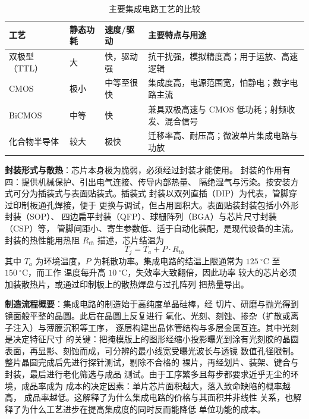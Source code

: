 \begin{table}[htbp]
\centering
\caption{主要集成电路工艺的比较}
\begin{tabular}{|p{2.2cm}|p{2.6cm}|p{2.4cm}|p{4.2cm}|}
\hline
\textbf{工艺} & \textbf{静态功耗} & \textbf{速度/驱动} & \textbf{主要特点与用途} \\
\hline
双极型（TTL） & 大 & 快，驱动强 & 抗干扰强，模拟精度高；用于运放、高速逻辑 \\
\hline
CMOS & 极小 & 中等至很快 & 集成度高，电源范围宽，怕静电；数字电路主流 \\
\hline
BiCMOS & 中等 & 快 & 兼具双极高速与 CMOS 低功耗；射频收发、混合信号 \\
\hline
化合物半导体 & 较大 & 极快 & 迁移率高、耐压高；微波单片集成电路与功放 \\
\hline
\end{tabular}
\end{table}

\textbf{封装形式与散热}：芯片本身极为脆弱，必须经过封装才能使用。
封装的作用有四：提供机械保护、引出电气连接、传导内部热量、
隔绝湿气与污染。按安装方式可分为插装式与表面贴装式。插装式
封装以双列直插（DIP）为代表，管脚穿过印制板通孔焊接，便于
更换与调试，但占用面积大。表面贴装封装包括小外形封装（SOP）、
四边扁平封装（QFP）、球栅阵列（BGA）与芯片尺寸封装（CSP）等，
管脚间距小、寄生参数低、适于自动化装配，是现代设备的主流。
封装的热性能用热阻 $R_{th}$ 描述，芯片结温为
\[
T_j = T_a + P \cdot R_{th}
\]
其中 $T_a$ 为环境温度，$P$ 为耗散功率。集成电路的结温上限通常为
$125\ ^{\circ}\mathrm{C}$ 至 $150\ ^{\circ}\mathrm{C}$，而工作
温度每升高 $10\ ^{\circ}\mathrm{C}$，失效率大致翻倍，因此功率
较大的芯片必须加装散热片，或通过印制板上的散热焊盘与过孔阵列
把热量导出。

\textbf{制造流程概要}：集成电路的制造始于高纯度单晶硅棒，经
切片、研磨与抛光得到镜面般平整的晶圆。此后在晶圆上反复进行
氧化、光刻、刻蚀、掺杂（扩散或离子注入）与薄膜沉积等工序，
逐层构建出晶体管结构与多层金属互连。其中光刻是决定特征尺寸
的关键：把掩模版上的图形经缩小投影曝光到涂有光刻胶的晶圆
表面，再显影、刻蚀而成，可分辨的最小线宽受曝光波长与透镜
数值孔径限制。整片晶圆完成后先进行探针测试，剔除不合格的
裸片，再经划片、装架、键合与封装，最后进行老化筛选与成品
测试。由于工序繁多且每步都要求近乎无尘的环境，成品率成为
成本的决定因素：单片芯片面积越大，落入致命缺陷的概率越高，
成品率越低。这解释了为什么集成电路的价格与其面积并非线性
关系，也解释了为什么工艺进步在提高集成度的同时反而能降低
单位功能的成本。

